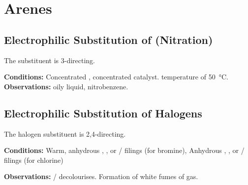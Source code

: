 




	\pagebreak
	\section{Arenes}

		\subsection{Electrophilic Substitution of  (Nitration)}

			The  substituent is 3-directing.

			\vspace{1.5em}
			\vbox{\textbf{Conditions:}	\tabto{35mm}Concentrated , concentrated  catalyst.
										\tabto{35mm} temperature of \SI{50}{\celsius}.}
			\vspace{0.75em}
			\vbox{\textbf{Observations:}\tabto{35mm} oily liquid, nitrobenzene.}





		\subsection{Electrophilic Substitution of Halogens}

			The halogen substituent is 2,4-directing.

			\vspace{1.5em}
			\vbox{\textbf{Conditions:}	\tabto{35mm}Warm, anhydrous , , or  / \ch{\Al} filings (for bromine),
										\tabto{35mm}Anhydrous , , or
													 / \ch{\Al} filings (for chlorine)}

			\vspace{0.75em}
			\vbox{\textbf{Observations:}\tabto{35mm}  /   decolourises.
										\tabto{35mm}Formation of white fumes of  gas.}

